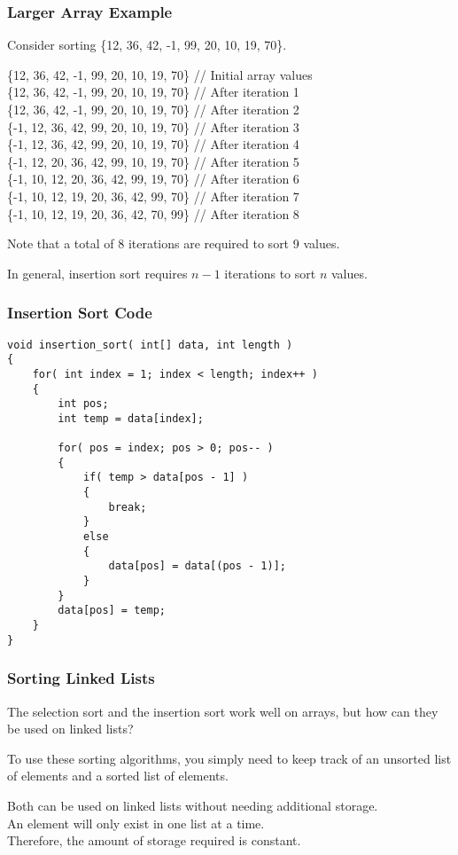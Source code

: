 \begin{frame}
\frametitle{Larger Array Example}

Consider sorting \{12, 36, 42, -1, 99, 20, 10, 19, 70\}.

	\{12, 36, 42, -1, 99, 20, 10, 19, 70\} 	// Initial array values\\
	\{\alert{12, 36}, 42, -1, 99, 20, 10, 19, 70\}	// After iteration 1\\
	\{\alert{12, 36, 42}, -1, 99, 20, 10, 19, 70\}	// After iteration 2\\
	\{\alert{-1, 12, 36, 42}, 99, 20, 10, 19, 70\}	// After iteration 3\\
	\{\alert{-1, 12, 36, 42, 99}, 20, 10, 19, 70\}	// After iteration 4\\
	\{\alert{-1, 12, 20, 36, 42, 99}, 10, 19, 70\}	// After iteration 5\\
	\{\alert{-1, 10, 12, 20, 36, 42, 99}, 19, 70\}	// After iteration 6\\
	\{\alert{-1, 10, 12, 19, 20, 36, 42, 99}, 70\}	// After iteration 7\\
 	\{\alert{-1, 10, 12, 19, 20, 36, 42, 70, 99}\}	// After iteration 8

Note that a total of 8 iterations are required to sort 9 values.

In general, insertion sort requires $n - 1$ iterations to sort $n$ values.

\end{frame}


\begin{frame}[fragile]
\frametitle{Insertion Sort Code}

{\scriptsize
\begin{verbatim}
void insertion_sort( int[] data, int length )
{
    for( int index = 1; index < length; index++ )
    {
        int pos;
        int temp = data[index];

        for( pos = index; pos > 0; pos-- )
        {
            if( temp > data[pos - 1] )
            {
                break;
            }
            else
            {
                data[pos] = data[(pos - 1)];
            }
        }
        data[pos] = temp;
    }
}
\end{verbatim}
}
\end{frame}


\begin{frame}
\frametitle{Sorting Linked Lists}

The selection sort and the insertion sort work well on arrays, but how can they be used on linked lists?

To use these sorting algorithms, you simply need to keep track of an unsorted list of elements and a sorted list of elements.

Both can be used on linked lists without needing additional storage.\\
\quad An element will only exist in one list at a time.\\
\quad Therefore, the amount of storage required is constant.

\end{frame}


